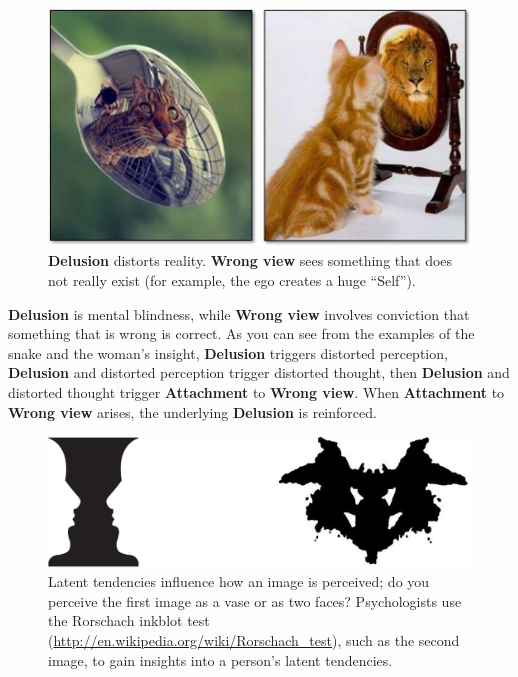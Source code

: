 \begin{figure}[H]

\centering
\includegraphics[width=0.8\linewidth]{./Diagrams/Cats}
\caption{\textbf{Delusion} distorts reality. \textbf{Wrong view} sees something that does not really exist (for example, the ego creates a huge “Self”).}
\label{fig:Cats}
\end{figure}

\textbf{Delusion} is mental blindness, while \textbf{Wrong view} involves conviction that something that is wrong is correct. As you can see from the examples of the snake and the woman's insight, \textbf{Delusion} triggers distorted perception, \textbf{Delusion} and distorted perception trigger distorted thought, then \textbf{Delusion} and distorted thought trigger \textbf{Attachment} to \textbf{Wrong view}. When \textbf{Attachment} to \textbf{Wrong view} arises, the underlying \textbf{Delusion} is reinforced.

\pagebreak

\begin{figure}[H]
\centering
\includegraphics[width=0.9\linewidth]{./Diagrams/Perception}
\caption{Latent tendencies influence how an image is perceived; do you perceive the first image as a vase or as two faces? Psychologists use the Rorschach inkblot test (\url{http://en.wikipedia.org/wiki/Rorschach_test}), such as the second image, to gain insights into a person’s latent tendencies.}
\label{fig:Perception}
\end{figure}

